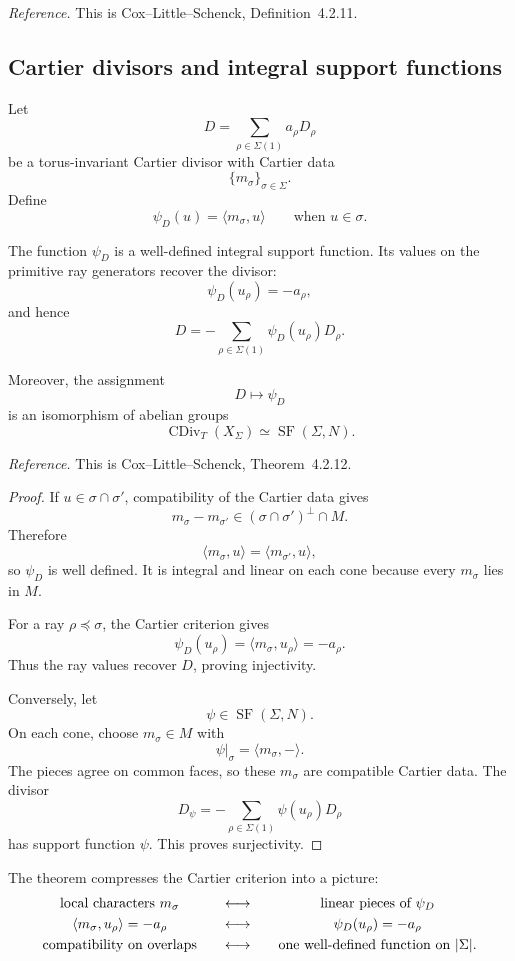 \noindent
\textit{Reference.}
This is Cox--Little--Schenck, Definition~4.2.11.

\subsection{Cartier divisors and integral support functions}

Let
\[
D=\sum_{\rho\in\Sigma(1)}a_\rho D_\rho
\]
be a torus-invariant Cartier divisor with Cartier data
\[
\{m_\sigma\}_{\sigma\in\Sigma}.
\]
Define
\[
\psi_D(u)
=
\langle m_\sigma,u\rangle
\qquad
\text{when }u\in\sigma.
\]

\begin{theorem}
\label{thm:support-function-dictionary}
The function \(\psi_D\) is a well-defined integral support function.
Its values on the primitive ray generators recover the divisor:
\[
\psi_D(u_\rho)=-a_\rho,
\]
and hence
\[
\boxed{
D
=
-\sum_{\rho\in\Sigma(1)}
\psi_D(u_\rho)D_\rho.
}
\]

Moreover, the assignment
\[
D\longmapsto\psi_D
\]
is an isomorphism of abelian groups
\[
\operatorname{CDiv}_T(X_\Sigma)
\simeq
\operatorname{SF}(\Sigma,N).
\]
\end{theorem}

\noindent
\textit{Reference.}
This is Cox--Little--Schenck, Theorem~4.2.12.

\begin{proof}
If \(u\in\sigma\cap\sigma'\), compatibility of the Cartier data gives
\[
m_\sigma-m_{\sigma'}
\in
(\sigma\cap\sigma')^\perp\cap M.
\]
Therefore
\[
\langle m_\sigma,u\rangle
=
\langle m_{\sigma'},u\rangle,
\]
so \(\psi_D\) is well defined. It is integral and linear on each cone
because every \(m_\sigma\) lies in \(M\).

For a ray \(\rho\preceq\sigma\), the Cartier criterion gives
\[
\psi_D(u_\rho)
=
\langle m_\sigma,u_\rho\rangle
=
-a_\rho.
\]
Thus the ray values recover \(D\), proving injectivity.

Conversely, let
\[
\psi\in\operatorname{SF}(\Sigma,N).
\]
On each cone, choose \(m_\sigma\in M\) with
\[
\psi|_\sigma=\langle m_\sigma,-\rangle.
\]
The pieces agree on common faces, so these \(m_\sigma\) are compatible
Cartier data. The divisor
\[
D_\psi
=
-\sum_{\rho\in\Sigma(1)}
\psi(u_\rho)D_\rho
\]
has support function \(\psi\). This proves surjectivity.
\end{proof}

The theorem compresses the Cartier criterion into a picture:
\[
\begin{array}{c@{\qquad\longleftrightarrow\qquad}c}
\text{local characters }m_\sigma
&
\text{linear pieces of }\psi_D
\\[1mm]
\langle m_\sigma,u_\rho\rangle=-a_\rho
&
\psi_D(u_\rho)=-a_\rho
\\[1mm]
\text{compatibility on overlaps}
&
\text{one well-defined function on }|\Sigma|.
\end{array}
\]

